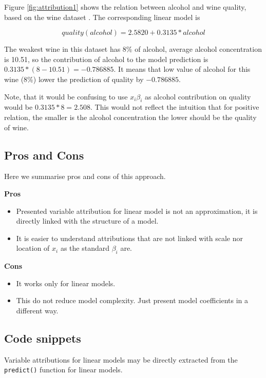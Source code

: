 \documentclass[]{krantz}
\providecommand{\tightlist}{%
  \setlength{\itemsep}{0pt}\setlength{\parskip}{0pt}}
\theoremstyle{definition}
\theoremstyle{definition}
\theoremstyle{definition}
\theoremstyle{remark}
\begin{document}
Figure \ref{fig:attribution1} shows the relation between alcohol and
wine quality, based on the wine dataset \citep{wine2009}. The
corresponding linear model is

\[
quality(alcohol) = 2.5820 + 0.3135 * alcohol
\]

The weakest wine in this dataset has 8\% of alcohol, average alcohol
concentration is 10.51, so the contribution of alcohol to the model
prediction is \(0.3135 *(8-10.51) = -0.786885\). It means that low value
of alcohol for this wine (8\%) lower the prediction of quality by
\(-0.786885\).

Note, that it would be confusing to use \(x_i\beta_i\) as alcohol
contribution on quality would be \(0.3135*8 = 2.508\). This would not
reflect the intuition that for positive relation, the smaller is the
alcohol concentration the lower should be the quality of wine.

\hypertarget{pros-and-cons}{%
\subsection{Pros and Cons}\label{pros-and-cons}}

Here we summarise pros and cons of this approach.

\textbf{Pros}

\begin{itemize}
\tightlist
\item
  Presented variable attribution for linear model is not an
  approximation, it is directly linked with the structure of a model.
\item
  It is easier to understand attributions that are not linked with scale
  nor location of \(x_i\) as the standard \(\beta_i\) are.
\end{itemize}

\textbf{Cons}

\begin{itemize}
\tightlist
\item
  It works only for linear models.
\item
  This do not reduce model complexity. Just present model coefficients
  in a different way.
\end{itemize}

\hypertarget{code-snippets-1}{%
\subsection{Code snippets}\label{code-snippets-1}}

Variable attributions for linear models may be directly extracted from
the \texttt{predict()} function for linear models.
\end{document}
